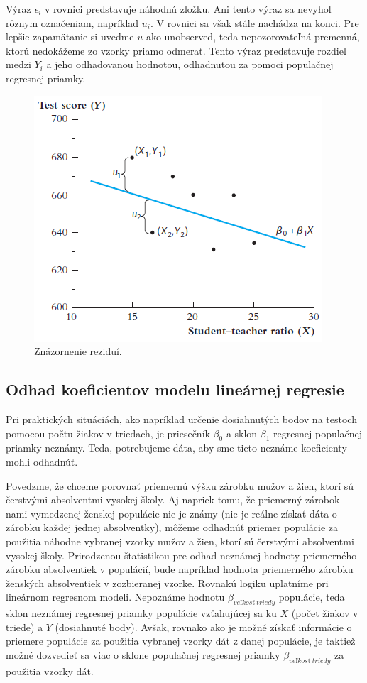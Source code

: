 \documentclass[]{tukediphc}
\begin{document}
Výraz $\epsilon_i$ v rovnici predstavuje náhodnú zložku. Ani tento výraz sa nevyhol rôznym označeniam, napríklad $u_i$. V rovnici sa však stále nachádza na konci. Pre lepšie zapamätanie si uveďme $u$ ako unobserved, teda nepozorovateľná premenná, ktorú nedokážeme zo vzorky priamo odmerať. Tento výraz predstavuje rozdiel medzi $Y_i$ a jeho odhadovanou hodnotou, odhadnutou za pomoci populačnej regresnej priamky.  \\


\begin{figure}
    \centering
    \includegraphics[scale=1.5]{diplomka obrazky/10.png}
    \caption{Znázornenie reziduí.}
\end{figure}

\subsection{Odhad koeficientov modelu lineárnej regresie}

Pri praktických situáciách, ako napríklad určenie dosiahnutých bodov na testoch pomocou počtu žiakov v triedach, je priesečník $\beta_0$ a sklon $\beta_1$ regresnej populačnej priamky neznámy. Teda, potrebujeme dáta, aby sme tieto neznáme koeficienty mohli odhadnúť. 

Povedzme, že chceme porovnať priemernú výšku zárobku mužov a žien, ktorí sú čerstvými absolventmi vysokej školy. Aj napriek tomu, že priemerný zárobok nami vymedzenej ženskej populácie nie je známy (nie je reálne získať dáta o zárobku každej jednej absolventky), môžeme odhadnúť priemer populácie za použitia náhodne vybranej vzorky mužov a žien, ktorí sú čerstvými absolventmi vysokej školy. Prirodzenou štatistikou pre odhad neznámej hodnoty priemerného zárobku absolventiek v populácií, bude napríklad hodnota priemerného zárobku ženských absolventiek v zozbieranej vzorke. Rovnakú logiku uplatníme pri lineárnom regresnom modeli. Nepoznáme hodnotu $\beta_{veľkosť \ triedy}$ populácie, teda sklon neznámej regresnej priamky populácie vzťahujúcej sa ku $X$ (počet žiakov v triede) a $Y$ (dosiahnuté body). Avšak, rovnako ako je možné získať informácie o priemere populácie za použitia vybranej vzorky dát z danej populácie, je taktiež možné dozvedieť sa viac o sklone populačnej regresnej priamky $\beta_{veľkosť \ triedy}$ za použitia vzorky dát. 
\end{document}

